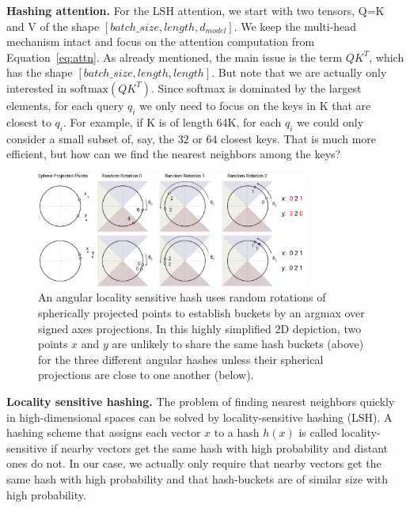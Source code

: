 \documentclass{article} %
\renewcommand{\paragraph}[1]{\textbf{#1}}
\begin{document}
\paragraph{Hashing attention.}
For the LSH attention, we start with two tensors, Q=K and V
of the shape $[batch\_size, length, d_{model}]$.
We keep the multi-head mechanism intact and focus on the attention
computation from Equation~\ref{eq:attn}. As already mentioned,
the main issue is the term $QK^T$, which has the shape
$[batch\_size, length, length]$. But note that we are actually only
interested in $\mathrm{softmax}(QK^T)$. Since softmax is dominated
by the largest elements, for each query $q_i$ we only need to focus
on the keys in K that are closest to $q_i$. For example, if K is of
length 64K, for each $q_i$ we could only consider a small subset of,
say, the $32$ or $64$ closest keys. That is much more efficient, but how
can we find the nearest neighbors among the keys?

\begin{figure}
    \centering
    \includegraphics[width=0.8\textwidth]{figures/angular-LSH.png}
    \caption{An angular locality sensitive hash uses random rotations of spherically projected 
    points to establish buckets by an argmax over signed axes projections.  In this highly 
    simplified 2D depiction, two points $x$ and $y$ are unlikely to share the same hash buckets 
    (above) for the three different angular hashes unless their spherical projections are close 
    to one another (below).}
    \label{fig:lsh}
\end{figure}

\paragraph{Locality sensitive hashing.}
The problem of finding nearest neighbors quickly in high-dimensional spaces
can be solved by locality-sensitive hashing (LSH). A hashing scheme that assigns each
vector $x$ to a hash $h(x)$ is called locality-sensitive if nearby
vectors get the same hash with high probability and distant ones do not.
In our case, we actually only require that nearby vectors get the same
hash with high probability and that hash-buckets are of similar size with
high probability.
\end{document}

